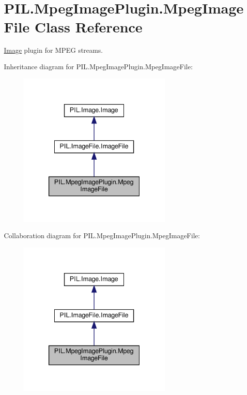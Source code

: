 \hypertarget{classPIL_1_1MpegImagePlugin_1_1MpegImageFile}{}\section{P\+I\+L.\+Mpeg\+Image\+Plugin.\+Mpeg\+Image\+File Class Reference}
\label{classPIL_1_1MpegImagePlugin_1_1MpegImageFile}


\hyperlink{namespacePIL_1_1Image}{Image} plugin for M\+P\+EG streams.  




Inheritance diagram for P\+I\+L.\+Mpeg\+Image\+Plugin.\+Mpeg\+Image\+File\+:
\nopagebreak
\begin{figure}[H]
\begin{center}
\leavevmode
\includegraphics[width=220pt]{classPIL_1_1MpegImagePlugin_1_1MpegImageFile__inherit__graph}
\end{center}
\end{figure}


Collaboration diagram for P\+I\+L.\+Mpeg\+Image\+Plugin.\+Mpeg\+Image\+File\+:
\nopagebreak
\begin{figure}[H]
\begin{center}
\leavevmode
\includegraphics[width=220pt]{classPIL_1_1MpegImagePlugin_1_1MpegImageFile__coll__graph}
\end{center}
\end{figure}
